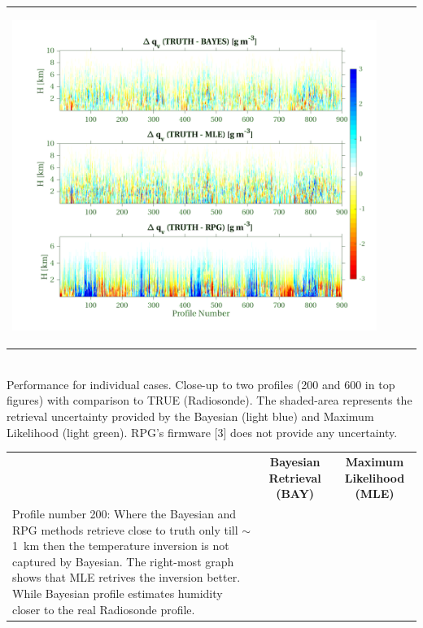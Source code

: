 \documentclass[landscape,paperwidth=1189mm,paperheight=841mm,fontscale=0.4,margin=.7cm]{baposter}
\begin{document}
\begin{poster}
{\begin{tabular}{ll|ll}
\begin{minipage}{0.35\linewidth}
		\begin{center}             
			\includegraphics[width=.99\linewidth]{QV_BAY_MLE_RPG_series.png}
		\end{center}
	\end{minipage}
\end{tabular}\\
\vspace{-0.5em}
\hline
\vspace{+1em}
{\Large Performance for individual cases. Close-up to two profiles (200 and 600 in top figures) with comparison to TRUE (Radiosonde). The shaded-area represents the retrieval uncertainty provided by the Bayesian (light blue) and Maximum Likelihood (light green). RPG's firmware [3] does not provide any uncertainty.}\\
\vspace{+2.5em}
\begin{tabular}{lcc} %
	& \textbf{\Large Bayesian Retrieval (BAY)} & \textbf{\Large Maximum Likelihood (MLE)}\\
	\begin{minipage}{0.18\linewidth}
		\colouredcircle \hspace{2em} Profile number 200: Where the Bayesian and RPG methods retrieve close to truth only till $\sim$1~km then the temperature inversion is not captured by Bayesian. The right-most graph shows that MLE retrives the inversion better. While Bayesian profile estimates humidity closer to the real Radiosonde profile.

\end{minipage}
\end{tabular}}
\end{poster}
\end{document}
